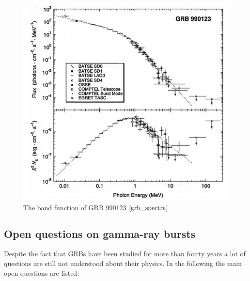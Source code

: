 \documentclass[12pt, a4paper,titlepage]{article}
\numberwithin{equation}{section}
\numberwithin{figure}{section}
\begin{document}
\begin{figure}[H]
\centering
\includegraphics[width=130.0mm]{images/grb_spectra.png}
\caption{The band function of GRB 990123 $\cite{grb_spectra}$}
\label{fig:grb_band}
\end{figure}

\subsection{Open questions on gamma-ray bursts}


Despite the fact that GRBs have been studied for more than fourty years a lot of questions are still not understood about their physics\cite{grb19}. In the following the main open questions are listed:
\end{document}
